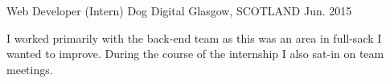 \begin{cventries}
  \cventry
    {Web Developer (Intern)} %
    {Dog Digital} %
    {Glasgow, SCOTLAND} %
    {Jun. 2015} %
    {
      \begin{cvitems} %
        \item I worked primarily with the back-end team as this was an area in full-sack I wanted to improve. During the course of the internship I also sat-in on team meetings.
      \end{cvitems}
    }
\end{cventries}

